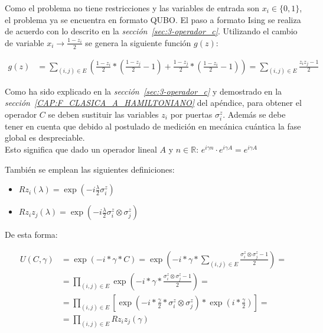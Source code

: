 Como el problema no tiene restricciones y las variables de entrada son $x_i \in \{0, 1\}$, el problema ya se encuentra en formato QUBO\@.
El paso a formato Ising se realiza de acuerdo con lo descrito en la \textit{sección~\ref{sec:3-operador_c}}.
Utilizando el cambio de variable $x_i \rightarrow \frac{1 - z_i}{2}$ se genera la siguiente función $g(z)$:

\begin{align}
  g(z) &= \sum_{(i, j) \in E} (\frac{1 - z_i}{2} * (\frac{1 - z_j}{2} - 1) + \frac{1 - z_j}{2} * (\frac{1 - z_i}{2} - 1)) = \sum_{(i, j) \in E} \frac{z_i z_j - 1}{2}
\end{align}

Como ha sido explicado en la \textit{sección~\ref{sec:3-operador_c}} y demostrado en la \textit{sección~\ref{CAP:F_CLASICA_A_HAMILTONIANO}} del apéndice, para obtener el operador $C$ se deben sustituir las variables $z_i$ por puertas $\sigma^z_i$.
Además se debe tener en cuenta que debido al postulado de medición en mecánica cuántica\cite{Nielsen_Chuang_2010} la fase global es despreciable.
\\
Esto significa que dado un operador lineal $A$ y $n \in \mathbb{R}$: $e^{i \gamma n} \cdot e^{i \gamma A} = e^{i \gamma A}$

También se emplean las siguientes definiciones:  %
\begin{itemize}
\item $ Rz_i(\lambda) = \exp(-i\frac{\lambda}{2}\sigma_i^z) $
\item $ Rz_i z_j(\lambda) = \exp(-i\frac{\lambda}{2}\sigma_i^z \otimes \sigma_j^z) $
\end{itemize}

De esta forma:

\begin{align}
  U(C, \gamma) &=  \exp(-i*\gamma*C) = \exp(-i*\gamma* \sum_{(i, j) \in E} \frac{\sigma_i^z \otimes \sigma_j^z - 1}{2}) = \nonumber \\
          &= \prod_{(i, j) \in E} \exp(-i*\gamma* \frac{\sigma_i^z \otimes \sigma_j^z - 1}{2}) = \nonumber \\
          &= \prod_{(i, j) \in E} [ \exp(-i*\frac{\gamma}{2}* \sigma_i^z \otimes \sigma_j^z) * \exp(i*\frac{\gamma}{2}) ] = \nonumber \\
          &= \prod_{(i, j) \in E} Rz_i z_j(\gamma)
\end{align}

